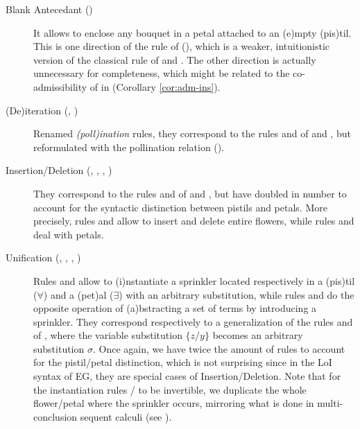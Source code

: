 \begin{description}
  \item[Blank Antecedant ()]
    It allows to enclose any bouquet in a petal attached to an
    \textsf{(e)}mpty \textsf{(pis)}til. This is one
    direction of the rule  of (), which is
    a weaker, intuitionistic version of the classical rule  of
     and . The other direction is actually unnecessary for
    completeness, which might be related to the co-admissibility of
     in  (Corollary \ref{cor:adm-ins}).

  \item[(De)iteration (, )]
    Renamed \emph{\textsf{(poll)}ination} rules, they correspond to the rules
     and  of  and , but reformulated
    with the pollination relation ().

  \item[Insertion/Deletion (, , , )]
    They correspond to the rules  and  of  and
    , but have doubled in number to account for the syntactic
    distinction between pistils and petals. More precisely, rules  and
     allow to insert and delete entire flowers, while rules 
    and  deal with petals.
    
  \item[Unification (, , , )]
    Rules  and  allow to \textsf{(i)}nstantiate a sprinkler
    located respectively in a \textsf{(pis)}til ($\forall$) and a
    \textsf{(pet)}al ($\exists$) with an arbitrary substitution, while rules
     and  do the opposite operation of
    \textsf{(a)}bstracting a set of terms by introducing a sprinkler. They
    correspond respectively to a generalization of the rules  and
     of , where the variable substitution $\{z/y\}$
    becomes an arbitrary substitution $\sigma$. Once again, we have twice the
    amount of rules to account for the pistil/petal distinction, which is not
    surprising since in the LoI syntax of EG, they are special cases of
    Insertion/Deletion. Note that for the instantiation rules
    / to be invertible, we duplicate the whole flower/petal
    where the sprinkler occurs, mirroring what is done in multi-conclusion
    sequent calculi (see ).
\end{description}

